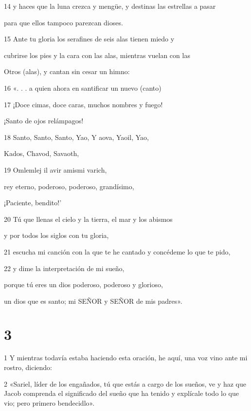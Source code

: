 \par 14 y haces que la luna crezca y mengüe, y destinas las estrellas a pasar
\par para que ellos tampoco parezcan dioses.

\par 15 Ante tu gloria los serafines de seis alas tienen miedo y
\par cubrirse los pies y la cara con las alas, mientras vuelan con las
\par Otros (alas), y cantan sin cesar un himno:

\par 16 «. . . a quien ahora en santificar un nuevo (canto)

\par 17 ¡Doce cimas, doce caras, muchos nombres y fuego!
\par ¡Santo de ojos relámpagos!

\par 18 Santo, Santo, Santo, Yao, Y aova, Yaoil, Yao,
\par Kados, Chavod, Savaoth,

\par 19 Omlemlej il avir amismi varich,
\par rey eterno, poderoso, poderoso, grandísimo,
\par ¡Paciente, bendito!'

\par 20 Tú que llenas el cielo y la tierra, el mar y los abismos
\par y por todos los siglos con tu gloria,

\par 21 escucha mi canción con la que te he cantado y concédeme lo que te pido,

\par 22 y dime la interpretación de mi sueño,
\par porque tú eres un dios poderoso, poderoso y glorioso,
\par un dios que es santo; mi SEÑOR y SEÑOR de mis padres».

\chapter{3}


\par 1 Y mientras todavía estaba haciendo esta oración, he aquí, una voz vino ante mi rostro, diciendo:

\par 2 «Sariel, líder de los engañados, tú que estás a cargo de los sueños, ve y haz que Jacob comprenda el significado del sueño que ha tenido y explícale todo lo que vio; pero primero bendecidlo».

